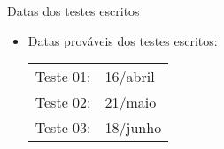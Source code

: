       \begin{slide}[toc=]{Datas dos testes escritos}
         \begin{itemize}
            \item Datas prováveis dos testes escritos:
            \begin{table}
               \centering
               \begin{tabular}{|l l|}
                  \hline
                  Teste 01: & 16/abril\\
                  Teste 02: & 21/maio\\
                  Teste 03: & 18/junho\\
                  \hline
               \end{tabular}
            \end{table}
         \end{itemize}
      \end{slide}

